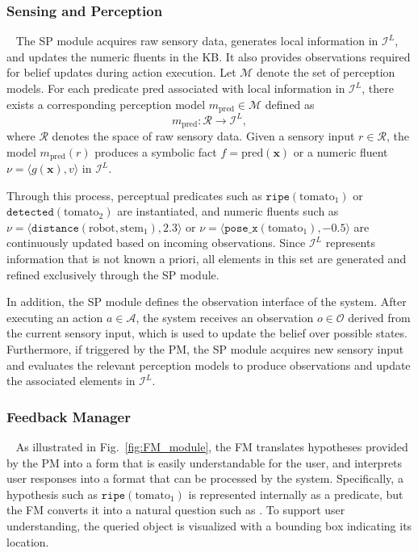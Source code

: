 \subsubsection{Sensing and Perception}~\label{method:SP}
The SP module acquires raw sensory data, generates local information in $\mathcal{I}^{L}$, and updates the numeric fluents in the KB. It also provides observations required for belief updates during action execution. Let $\mathcal{M}$ denote the set of perception models. For each predicate $\text{pred}$ associated with local information in $\mathcal{I}^{L}$, there exists a corresponding perception model $m_{\text{pred}} \in \mathcal{M}$ defined as
\[
m_{\text{pred}} : \mathcal{R} \rightarrow \mathcal{I}^{L},
\]
where $\mathcal{R}$ denotes the space of raw sensory data. Given a sensory input $r \in \mathcal{R}$, the model $m_{\text{pred}}(r)$ produces a symbolic fact $f = \text{pred}(\mathbf{x})$ or a numeric fluent $\nu = \langle g(\mathbf{x}), v \rangle$ in $\mathcal{I}^{L}$.

Through this process, perceptual predicates such as $\texttt{ripe}(\text{tomato}_1)$ or $\texttt{detected}(\text{tomato}_2)$ are instantiated, and numeric fluents such as $\nu = \langle \texttt{distance}(\text{robot}, \text{stem}_1), 2.3 \rangle$ or $\nu = \langle \texttt{pose\_x}(\text{tomato}_1), -0.5 \rangle$ are continuously updated based on incoming observations. Since $\mathcal{I}^{L}$ represents information that is not known a priori, all elements in this set are generated and refined exclusively through the SP module.

In addition, the SP module defines the observation interface of the system. After executing an action $a \in \mathcal{A}$, the system receives an observation $o \in \mathcal{O}$ derived from the current sensory input, which is used to update the belief over possible states. Furthermore, if triggered by the PM, the SP module acquires new sensory input and evaluates the relevant perception models to produce observations and update the associated elements in $\mathcal{I}^{L}$.





\subsubsection{Feedback Manager}~\label{method:FM}
As illustrated in Fig.~\ref{fig:FM_module}, the FM translates hypotheses provided by the PM into a form that is easily understandable for the user, and interprets user responses into a format that can be processed by the system. Specifically, a hypothesis such as $\texttt{ripe}(\text{tomato}_1)$ is represented internally as a predicate, but the FM converts it into a natural question such as . To support user understanding, the queried object is visualized with a bounding box indicating its location.

